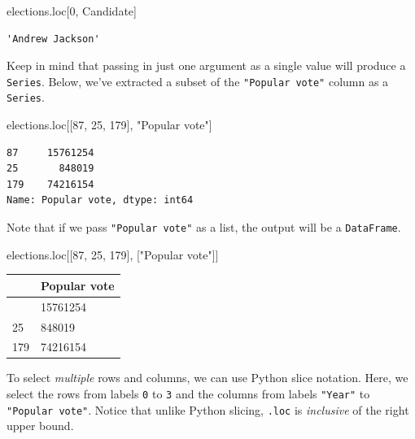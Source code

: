 \documentclass[
  letterpaper,
  DIV=11,
  numbers=noendperiod]{scrreprt}
\newenvironment{Shaded}{\begin{snugshade}}{\end{snugshade}}
\newcommand{\DecValTok}[1]{\textcolor[rgb]{0.68,0.00,0.00}{#1}}
\newcommand{\NormalTok}[1]{\textcolor[rgb]{0.00,0.23,0.31}{#1}}
\newcommand{\StringTok}[1]{\textcolor[rgb]{0.13,0.47,0.30}{#1}}
\begin{document}
\begin{Shaded}
\begin{Highlighting}[]
\NormalTok{elections.loc[}\DecValTok{0}\NormalTok{, }\StringTok{\textquotesingle{}Candidate\textquotesingle{}}\NormalTok{]}
\end{Highlighting}
\end{Shaded}

\begin{verbatim}
'Andrew Jackson'
\end{verbatim}

Keep in mind that passing in just one argument as a single value will
produce a \texttt{Series}. Below, we've extracted a subset of the
\texttt{"Popular\ vote"} column as a \texttt{Series}.

\begin{Shaded}
\begin{Highlighting}[]
\NormalTok{elections.loc[[}\DecValTok{87}\NormalTok{, }\DecValTok{25}\NormalTok{, }\DecValTok{179}\NormalTok{], }\StringTok{"Popular vote"}\NormalTok{]}
\end{Highlighting}
\end{Shaded}

\begin{verbatim}
87     15761254
25       848019
179    74216154
Name: Popular vote, dtype: int64
\end{verbatim}

Note that if we pass \texttt{"Popular\ vote"} as a list, the output will
be a \texttt{DataFrame}.

\begin{Shaded}
\begin{Highlighting}[]
\NormalTok{elections.loc[[}\DecValTok{87}\NormalTok{, }\DecValTok{25}\NormalTok{, }\DecValTok{179}\NormalTok{], [}\StringTok{"Popular vote"}\NormalTok{]]}
\end{Highlighting}
\end{Shaded}

\begin{longtable}[]{@{}ll@{}}
\toprule\noalign{}
& Popular vote \\
\midrule\noalign{}
\endhead
\bottomrule\noalign{}
\endlastfoot
87 & 15761254 \\
25 & 848019 \\
179 & 74216154 \\
\end{longtable}

To select \emph{multiple} rows and columns, we can use Python slice
notation. Here, we select the rows from labels \texttt{0} to \texttt{3}
and the columns from labels \texttt{"Year"} to \texttt{"Popular\ vote"}.
Notice that unlike Python slicing, \texttt{.loc} is \emph{inclusive} of
the right upper bound.
\end{document}
